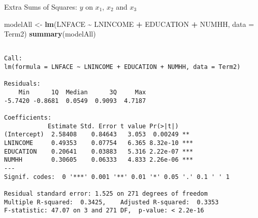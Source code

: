 \documentclass[
  ignorenonframetext,
]{beamer}
\newenvironment{Shaded}{\begin{snugshade}}{\end{snugshade}}
\newcommand{\AttributeTok}[1]{\textcolor[rgb]{0.13,0.29,0.53}{#1}}
\newcommand{\FunctionTok}[1]{\textcolor[rgb]{0.13,0.29,0.53}{\textbf{#1}}}
\newcommand{\NormalTok}[1]{#1}
\newcommand{\OtherTok}[1]{\textcolor[rgb]{0.56,0.35,0.01}{#1}}
\newcommand{\SpecialCharTok}[1]{\textcolor[rgb]{0.81,0.36,0.00}{\textbf{#1}}}
\begin{document}
\begin{frame}[fragile]{Extra Sums of Squares: \(y\) on \(x_1\), \(x_2\)
and \(x_3\)}
\protect\hypertarget{extra-sums-of-squares-y-on-x_1-x_2-and-x_3}{}
\scriptsize

\begin{Shaded}
\begin{Highlighting}[]
\NormalTok{modelAll }\OtherTok{\textless{}{-}} \FunctionTok{lm}\NormalTok{(LNFACE }\SpecialCharTok{\textasciitilde{}}\NormalTok{ LNINCOME }\SpecialCharTok{+}\NormalTok{ EDUCATION }\SpecialCharTok{+}\NormalTok{ NUMHH, }\AttributeTok{data =}\NormalTok{ Term2)}
\FunctionTok{summary}\NormalTok{(modelAll)}
\end{Highlighting}
\end{Shaded}

\begin{verbatim}

Call:
lm(formula = LNFACE ~ LNINCOME + EDUCATION + NUMHH, data = Term2)

Residuals:
    Min      1Q  Median      3Q     Max 
-5.7420 -0.8681  0.0549  0.9093  4.7187 

Coefficients:
            Estimate Std. Error t value Pr(>|t|)    
(Intercept)  2.58408    0.84643   3.053  0.00249 ** 
LNINCOME     0.49353    0.07754   6.365 8.32e-10 ***
EDUCATION    0.20641    0.03883   5.316 2.22e-07 ***
NUMHH        0.30605    0.06333   4.833 2.26e-06 ***
---
Signif. codes:  0 '***' 0.001 '**' 0.01 '*' 0.05 '.' 0.1 ' ' 1

Residual standard error: 1.525 on 271 degrees of freedom
Multiple R-squared:  0.3425,    Adjusted R-squared:  0.3353 
F-statistic: 47.07 on 3 and 271 DF,  p-value: < 2.2e-16
\end{verbatim}

\normalsize
\end{frame}
\end{document}
